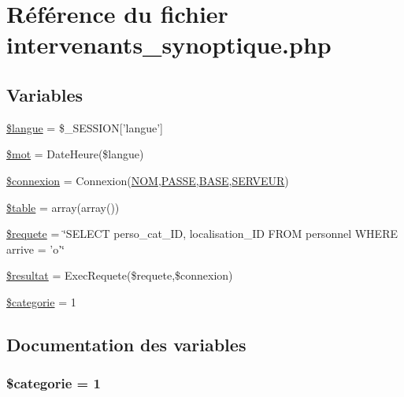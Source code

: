 \hypertarget{intervenants__synoptique_8php}{
\section{R\'{e}f\'{e}rence du fichier intervenants\_\-synoptique.php}
\label{intervenants__synoptique_8php}
}
\subsection*{Variables}
\begin{CompactItemize}
\item 
\hyperlink{intervenants__synoptique_8php_a0}{\$langue} = \$\_\-SESSION\mbox{[}'langue'\mbox{]}
\item 
\hyperlink{intervenants__synoptique_8php_a1}{\$mot} = Date\-Heure(\$langue)
\item 
\hyperlink{intervenants__synoptique_8php_a2}{\$connexion} = Connexion(\hyperlink{pma__connect_8php_a0}{NOM},\hyperlink{pma__connect_8php_a1}{PASSE},\hyperlink{pma__connect_8php_a3}{BASE},\hyperlink{pma__connect_8php_a2}{SERVEUR})
\item 
\hyperlink{intervenants__synoptique_8php_a3}{\$table} = array(array())
\item 
\hyperlink{intervenants__synoptique_8php_a4}{\$requete} = \char`\"{}SELECT perso\_\-cat\_\-ID, localisation\_\-ID FROM personnel WHERE arrive = 'o'\char`\"{}
\item 
\hyperlink{intervenants__synoptique_8php_a5}{\$resultat} = Exec\-Requete(\$requete,\$connexion)
\item 
\hyperlink{intervenants__synoptique_8php_a6}{\$categorie} = 1
\end{CompactItemize}


\subsection{Documentation des variables}
\hypertarget{intervenants__synoptique_8php_a6}{
\subsubsection[\$categorie]{\setlength{\rightskip}{0pt plus 5cm}\$categorie = 1}}
\label{intervenants__synoptique_8php_a6}


